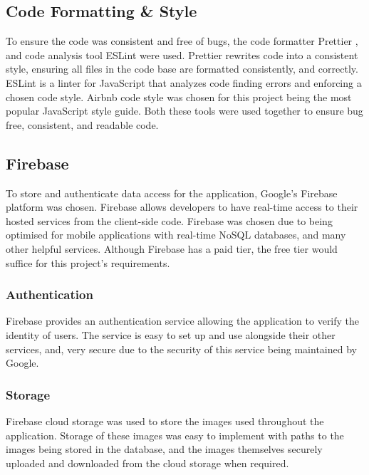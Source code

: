 \subsection{Code Formatting \& Style} \label{CodeF&S}
To ensure the code was consistent and free of bugs, the code formatter Prettier \cite{prettier}, and code analysis tool ESLint \cite{eslint} were used. Prettier rewrites code into a consistent style, ensuring all files in the code base are formatted consistently, and correctly. ESLint is a linter for JavaScript that analyzes code finding errors and enforcing a chosen code style. Airbnb \cite{airbnb} code style was chosen for this project being the most popular JavaScript style guide. Both these tools were used together to ensure bug free, consistent, and readable code. 
\subsection{Firebase}\label{firebaseSection}
To store and authenticate data access for the application, Google's Firebase \cite{firebase} platform was chosen. Firebase allows developers to have real-time access to their hosted services from the client-side code. Firebase was chosen due to being optimised for mobile applications with real-time NoSQL \cite{nosql} databases, and many other helpful services. Although Firebase has a paid tier, the free tier would suffice for this project's requirements.     
\subsubsection{Authentication}
Firebase provides an authentication service allowing the application to verify the identity of users. The service is easy to set up and use alongside their other services, and, very secure due to the security of this service being maintained by Google.
\subsubsection{Storage}
Firebase cloud storage was used to store the images used throughout the application. Storage of these images was easy to implement with paths to the images being stored in the database, and the images themselves securely uploaded and downloaded from the cloud storage when required.
